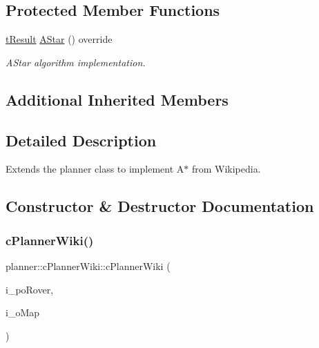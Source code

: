 \subsection*{Protected Member Functions}
\begin{DoxyCompactItemize}
\item 
\mbox{\hyperlink{structt_result}{t\+Result}} \mbox{\hyperlink{classplanner_1_1c_planner_wiki_a2652cf0e84d0a1fcd17e6c4288179955}{A\+Star}} () override
\begin{DoxyCompactList}\small\item\em A\+Star algorithm implementation. \end{DoxyCompactList}\end{DoxyCompactItemize}
\subsection*{Additional Inherited Members}


\subsection{Detailed Description}
Extends the planner class to implement A$\ast$ from Wikipedia. 

\subsection{Constructor \& Destructor Documentation}
\mbox{\label{classplanner_1_1c_planner_wiki_aed6ae97e85a338e082ec2879629f0f3b}} 
\subsubsection{\texorpdfstring{c\+Planner\+Wiki()}{cPlannerWiki()}}
{\footnotesize\ttfamily planner\+::c\+Planner\+Wiki\+::c\+Planner\+Wiki (\begin{DoxyParamCaption}\item[{std\+::shared\+\_\+ptr$<$ \mbox{\hyperlink{classplanner_1_1c_rover_interface}{c\+Rover\+Interface}}$<$ 8 $>$$>$}]{i\+\_\+po\+Rover,  }\item[{std\+::shared\+\_\+ptr$<$ \mbox{\hyperlink{classplanner_1_1c_graph}{c\+Graph}} $>$}]{i\+\_\+o\+Map }\end{DoxyParamCaption})}



